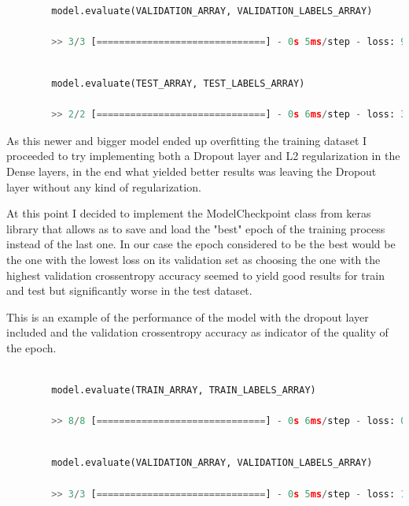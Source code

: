 \documentclass[12pt, a4paper]{article}
\begin{document}
	\clearpage
	
	\begin{lstlisting}[language=Python]
		
		model.evaluate(VALIDATION_ARRAY, VALIDATION_LABELS_ARRAY)
		
		>> 3/3 [==============================] - 0s 5ms/step - loss: 9.1578 - categorical_accuracy: 0.4189 - accuracy: 0.0405
	\end{lstlisting}
	
	\begin{lstlisting}[language=Python]
		
		model.evaluate(TEST_ARRAY, TEST_LABELS_ARRAY)
		
		>> 2/2 [==============================] - 0s 6ms/step - loss: 37.8091 - categorical_accuracy: 0.3051 - accuracy: 0.0381
	\end{lstlisting}
		\vspace{5mm}
	
	As this newer and bigger model ended up overfitting the training dataset I proceeded to try implementing both a Dropout layer and L2 regularization in the Dense layers, in the end what yielded better results was leaving the Dropout layer without any kind of regularization.
	
	At this point I decided to implement the ModelCheckpoint class from keras library that allows as to save and load the "best" epoch of the training process instead of the last one. In our case the epoch considered to be the best would be the one with the lowest loss on its validation set as choosing the one with the highest validation crossentropy accuracy seemed to yield good results for train and test but significantly worse in the test dataset.
	
	This is an example of the performance of the model with the dropout layer included and the validation crossentropy accuracy as indicator of the quality of the epoch.
	
		\vspace{5mm}
	\begin{lstlisting}[language=Python]
		
		model.evaluate(TRAIN_ARRAY, TRAIN_LABELS_ARRAY)
		
		>> 8/8 [==============================] - 0s 6ms/step - loss: 0.9080 - categorical_accuracy: 0.5252 - accuracy: 0.0000e+00
	\end{lstlisting}
	
	\clearpage
	
	\begin{lstlisting}[language=Python]
		
		model.evaluate(VALIDATION_ARRAY, VALIDATION_LABELS_ARRAY)
		
		>> 3/3 [==============================] - 0s 5ms/step - loss: 1.1463 - categorical_accuracy: 0.5541 - accuracy: 0.0000e+00
	\end{lstlisting}
	
\end{document}
